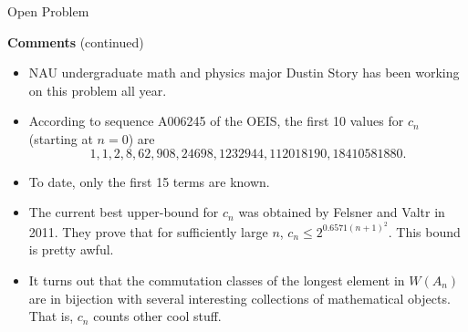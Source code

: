 \documentclass[10pt, compress,aspectratio=169,handout]{beamer}
\begin{document}

\begin{frame}{Open Problem}\pause

\vspace{1em}

\begin{block}{\textbf{Comments} (continued)}

\vspace{-.5em}

\begin{itemize}
\item NAU undergraduate math and physics major \alert{Dustin Story} has been working on this problem all year. \pause
\item According to sequence \alert{A006245} of the OEIS, the first 10 values for $c_n$ (starting at $n=0$) are
\[
1, 1, 2, 8, 62, 908, 24698, 1232944, 112018190, 18410581880.
\]
\pause
\item To date, only the first 15 terms are known. \pause
\item The current best upper-bound for $c_n$ was obtained by Felsner and Valtr in 2011.  They prove that for sufficiently large $n$, $c_n\leq 2^{0.6571(n+1)^2}$. This bound is pretty awful.\pause
\item It turns out that the commutation classes of the longest element in $W(A_n)$ are in bijection with several interesting collections of mathematical objects. That is, $c_n$ counts other cool stuff.
\end{itemize}
\end{block}

\end{frame}

\end{document}
